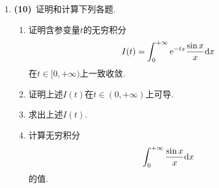 \documentclass{ctexart}
\begin{document}
\begin{enumerate}[leftmargin=*,label=\textbf{\arabic*.},topsep=0pt,parsep=0pt,itemsep=0pt,partopsep=0pt]
    \item \textbf{(10)}\ 证明和计算下列各题.
        \begin{enumerate}[label=\tbf{(\arabic*)},topsep=0pt,parsep=0pt,itemsep=0pt,partopsep=0pt]
            \item 证明含参变量$t$的无穷积分
                \[I(t)=\int_0^{+\infty}\mathrm{e}^{-tx}\dfrac{\sin x}{x}\mathrm{d} x\]
                在$t\in[0,+\infty)$上一致收敛.
            \item 证明上述$I(t)$在$t\in(0,+\infty)$上可导.
            \item 求出上述$I(t)$.
            \item 计算无穷积分
                \[\int_0^{+\infty}\dfrac{\sin x}{x}\mathrm{d} x\]
                的值.
        \end{enumerate}

\end{enumerate}
\end{document}
